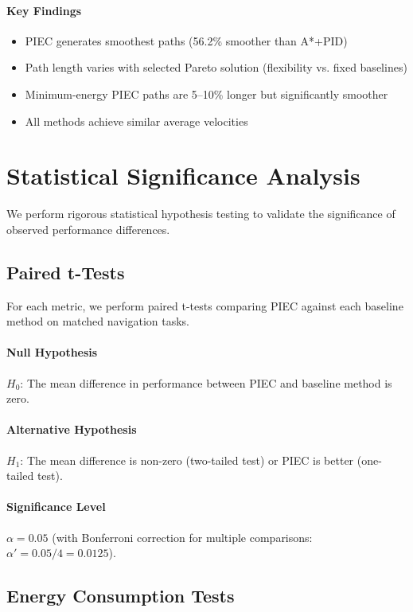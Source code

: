 \paragraph{Key Findings}
\begin{itemize}
    \item PIEC generates smoothest paths (56.2\% smoother than A*+PID)
    \item Path length varies with selected Pareto solution (flexibility vs. fixed baselines)
    \item Minimum-energy PIEC paths are 5--10\% longer but significantly smoother
    \item All methods achieve similar average velocities
\end{itemize}

\section{Statistical Significance Analysis}
\label{sec:statistical_analysis}

We perform rigorous statistical hypothesis testing to validate the significance of observed performance differences.

\subsection{Paired t-Tests}

For each metric, we perform paired t-tests comparing PIEC against each baseline method on matched navigation tasks.

\paragraph{Null Hypothesis}
$H_0$: The mean difference in performance between PIEC and baseline method is zero.

\paragraph{Alternative Hypothesis}
$H_1$: The mean difference is non-zero (two-tailed test) or PIEC is better (one-tailed test).

\paragraph{Significance Level}
$\alpha = 0.05$ (with Bonferroni correction for multiple comparisons: $\alpha' = 0.05/4 = 0.0125$).

\subsection{Energy Consumption Tests}

